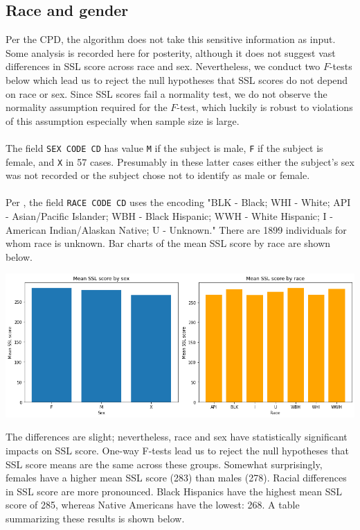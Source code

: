 \subsection{Race and gender}
Per the CPD, the algorithm does not take this sensitive information as input. Some analysis is recorded here for posterity, although it does not suggest vast differences in SSL score across race and sex. Nevertheless, we conduct two $F$-tests below which lead us to reject the null hypotheses that SSL scores do not depend on race or sex. Since SSL scores fail a normality test, we do not observe the normality assumption required for the $F$-test, which luckily is robust to violations of this assumption especially when sample size is large.\\\\
The field \texttt{SEX CODE CD} has value \texttt{M} if the subject is male, \texttt{F} if the subject is female, and \texttt{X} in 57 cases. Presumably in these latter cases either the subject's sex was not recorded or the subject chose not to identify as male or female.\\\\
Per \cite{data}, the field \texttt{RACE CODE CD} uses the encoding "BLK - Black; WHI - White; API - Asian/Pacific Islander; WBH - Black Hispanic; WWH - White Hispanic; I - American Indian/Alaskan Native; U - Unknown." There are 1899 individuals for whom race is unknown. Bar charts of the mean SSL score by race are shown below.
\begin{center}
    \includegraphics[scale=.5]{images/race.png}
\end{center}
The differences are slight; nevertheless, race and sex have statistically significant impacts on SSL score. One-way F-tests lead us to reject the null hypotheses that SSL score means are the same across these groups. Somewhat surprisingly, females have a higher mean SSL score (283) than males (278). Racial differences in SSL score are more pronounced. Black Hispanics have the highest mean SSL score of 285, whereas Native Americans have the lowest: 268. A table summarizing these results is shown below.
